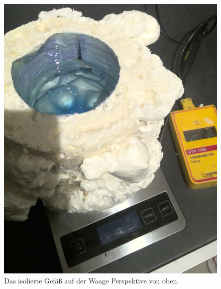 \documentclass[11pt, ngerman]{scrartcl}
\begin{document}
\begin{figure}[H]
    \centering
        \begin{minipage}[t]{.33\linewidth} %
            \includegraphics[width=\linewidth]{pics/Aufbau (1).jpg}
            \caption[Aufbau isoliertes Gefäß auf der Waage (Oben)]{Das isolierte Gefäß
            auf der Waage Perspektive von oben.}
            \label{fig:waageaufbau1}
        \end{minipage}
        \begin{minipage}[t]{.33\linewidth} %

\end{minipage}
\end{figure}
\end{document}

